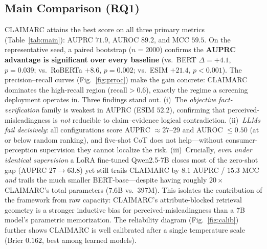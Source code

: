 \subsection{Main Comparison (RQ1)}
\label{sec:exp:main}

CLAIMARC attains the best score on all three primary metrics
(Table~\ref{tab:main}): AUPRC $71.9$, AUROC $89.2$, and MCC $59.5$. On the
representative seed, a paired bootstrap ($n{=}2000$) confirms the
\textbf{AUPRC advantage is significant over every baseline} (vs.\ BERT
$\Delta{=}{+}4.1$, $p{=}0.039$; vs.\ RoBERTa ${+}8.6$, $p{=}0.002$; vs.\ ESIM
${+}21.4$, $p{<}0.001$). The precision--recall curves
(Fig.~\ref{fig:prroc}) make the gain concrete: CLAIMARC dominates the
high-recall region ($\text{recall}{>}0.6$), exactly the regime a screening
deployment operates in. Three findings stand out. (i)~The \emph{objective
fact-verification} family is weakest in AUPRC (ESIM $52.2$), confirming that
perceived-misleadingness is \emph{not} reducible to claim--evidence logical
contradiction. (ii)~\emph{LLMs fail decisively}: all configurations score AUPRC
$\approx 27$--$29$ and AUROC $\le 0.50$ (at or below random ranking), and
five-shot CoT does not help---without consumer-perception supervision they
cannot localize the risk. (iii)~Crucially, \emph{even under identical
supervision} a LoRA fine-tuned Qwen2.5-7B closes most of the zero-shot gap
(AUPRC $27\!\to\!63.8$) yet still trails CLAIMARC by $8.1$ AUPRC / $15.3$ MCC
\emph{and} trails the much smaller BERT-base---despite having roughly
$20\times$ CLAIMARC's total parameters ($7.6$B vs.\ $397$M). This isolates the
contribution of the framework from raw capacity: CLAIMARC's attribute-blocked
retrieval geometry is a stronger inductive bias for perceived-misleadingness
than a 7B model's parametric memorization. The reliability diagram
(Fig.~\ref{fig:calib}) further shows CLAIMARC is well calibrated after a single
temperature scale (Brier $0.162$, best among learned models).


